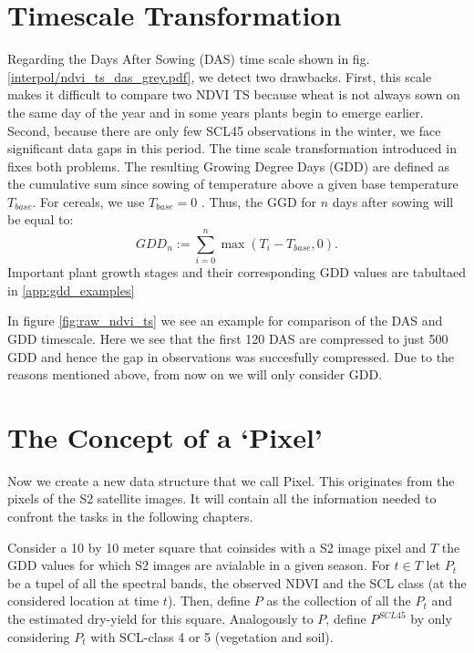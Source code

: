 \section{Timescale Transformation}\label{sec:gdd_def}
	{%
		Regarding the Days After Sowing (DAS) time scale shown in fig. \ref{interpol/ndvi_ts_das_grey.pdf}, we detect two drawbacks. First, this scale makes it difficult to compare two NDVI {TS} because wheat is not always sown on the same day of the year and in some years plants begin to emerge earlier. Second, because there are only few SCL45 observations in the winter, we face significant data gaps in this period. The time scale transformation introduced in \cite{mcmasterGrowingDegreedaysOne1997} fixes both problems. The resulting Growing Degree Days ({GDD}) are defined as the cumulative sum since sowing of temperature above a given base temperature $T_{base}$. For cereals, we use $T_{base}=0$ \citep{perichPixelbasedCropYield2022}. Thus, the GGD for $n$ days after sowing will be equal to:
		\begin{equation}
			\label{eq:gdd}
			GDD_n := \sum_{i=0}^n \max(T_i - T_{base}, 0).
		\end{equation}
		Important plant growth stages and their corresponding GDD values are tabultaed in \ref{app:gdd_examples}

		In figure \ref{fig:raw_ndvi_ts} we see an example for comparison of the DAS and GDD timescale. Here we see that the first 120 DAS are compressed to just 500 GDD and hence the gap in observations was succesfully compressed. Due to the reasons mentioned above, from now on we will only consider GDD.
	} 

\section{The Concept of a `Pixel'}{ \label{sec:gather_data_to_pixel}
	Now we create a new data structure that we call Pixel. This originates from the pixels of the S2 satellite images. It will contain all the information needed to confront the tasks in the following chapters. 
		
		Consider a 10 by 10 meter square that coinsides with a S2 image pixel and $T$ the GDD values for which S2 images are avialable in a given season. For $t\in T$ let $P_t$ be a tupel of all the spectral bands, the observed NDVI and the SCL class (at the considered location at time $t$). Then, define $P$ as the collection of all the $P_t$ and the estimated dry-yield for this square.
		Analogously to $P$, define $P^{SCL45}$ by only considering $P_t$ with SCL-class 4 or 5 (vegetation and soil).  
}


